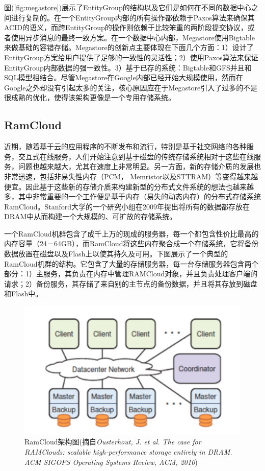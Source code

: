 图(\ref{fig:megastore})展示了EntityGroup的结构以及它们是如何在不同的数据中心之间进行复制的。在一个EntityGroup内部的所有操作都依赖于Paxos算法来确保其ACID的语义，而跨EntityGroup的操作则依赖于比较笨重的两阶段提交协议，或者使用异步消息的最终一致方案。在一个数据中心内部，Megastore使用Bigtable来做基础的容错存储。Megastore的创新点主要体现在下面几个方面：1）设计了EntityGroup方案给用户提供了足够的一致性的灵活性；2）使用Paxos算法来保证EntityGroup内部数据的强一致性。3）基于已存的系统：Bigtable和GFS并且和SQL模型相结合。尽管Megastore在Google内部已经开始大规模使用，然而在Google之外却没有引起太多的关注，核心原因应在于Megastore引入了过多的不是很成熟的优化，使得该架构更像是一个专用存储系统。

\subsection{RamCloud}

近期，随着基于云的应用程序的不断发布和流行，特别是基于社交网络的各种服务，交互式在线服务，人们开始注意到基于磁盘的传统存储系统相对于这些在线服务，问题也越来越大，尤其在速度上非常明显。另一方面，新的存储介质的发展也非常迅速，包括非易失性内存（PCM， Memristor以及STTRAM）等变得越来越便宜。因此基于这些新的存储介质来构建新型的分布式文件系统的想法也越来越多，其中非常重要的一个工作便是基于内存（易失的动态内存）的分布式存储系统RamCloud。Stanford大学的一个研究小组在2009年提出将所有的数据都存放在DRAM中从而构建一个大规模的、可扩放的存储系统。

一个RamCloud机群包含了成千上万的现成的服务器，每一个都包含性价比最高的内存容量（24－64GB），而RamCloud将这些内存聚合成一个存储系统，它将备份数据放置在磁盘以及Flash上以使其持久及可用。下图展示了一个典型的RamCloud机群的结构。它包含了大量的存储服务器，每一台存储服务器包含两个部分：1）主服务，其负责在内存中管理RAMCloud对象，并且负责处理客户端的请求；2）备份服务，其存储了来自别的主节点的备份数据，并且将其存放到磁盘和Flash中。

\begin{figure}[]
\centering
\includegraphics[width=4.5in]{../figures/ramcloud.pdf}
\caption{RamCloud架构图(摘自\textit{Ousterhout, J. et al. The case for RAMClouds: scalable high-performance storage entirely in DRAM. ACM SIGOPS Operating Systems Review, ACM, 2010})}
\label{fig:ramcloud}
\end{figure}



